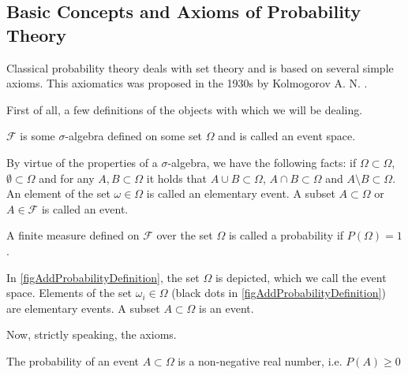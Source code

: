 \subsection{Basic Concepts and Axioms of Probability Theory}

Classical probability theory deals with set theory and is based on several simple axioms. This axiomatics was proposed in the 1930s by Kolmogorov A. N. \cite{bKolmogorov74basic}. 

First of all, a few definitions of the objects with which we will be dealing. 

\begin{definition}
\label{def:events_set}  
  $\mathcal{F}$ is some $\sigma$-algebra defined on some
set $\Omega$ and is called an event space. 
\end{definition}

\begin{remark}
  By virtue of the properties of a $\sigma$-algebra, we have the following facts: if
  $\Omega \subset \Omega$, $\emptyset \subset \Omega$ and for any
  $A,B \subset \Omega$ it holds that
  $A \cup B \subset \Omega$, $A \cap B \subset \Omega$ and
  $A \setminus B \subset \Omega$.  An element of the set
  $\omega \in \Omega$ is called an elementary event. A subset 
  $A \subset \Omega$ or $A \in \mathcal{F}$ is called an event.
\end{remark}

\begin{definition}[Probability $P$]
  \label{def:probability}
  A finite measure defined on $\mathcal{F}$ over the set $\Omega$
  is called a probability if $P\left(\Omega\right) = 1$.
\end{definition}

\begin{example}

In \autoref{figAddProbabilityDefinition}, the set
$\Omega$ is depicted, which we call the event space. Elements
of the set $\omega_i \in \Omega$ (black dots in
\autoref{figAddProbabilityDefinition}) are elementary
events. A subset $A \subset \Omega$ is an event.
\end{example}

Now, strictly speaking, the axioms.

\begin{axiom}
  \label{axProbabilityKolmogorovNonNegativity}
  The probability of an event $A \subset \Omega$ is a non-negative
  real number, i.e. $P\left(A\right) \ge 0$
\end{axiom}

